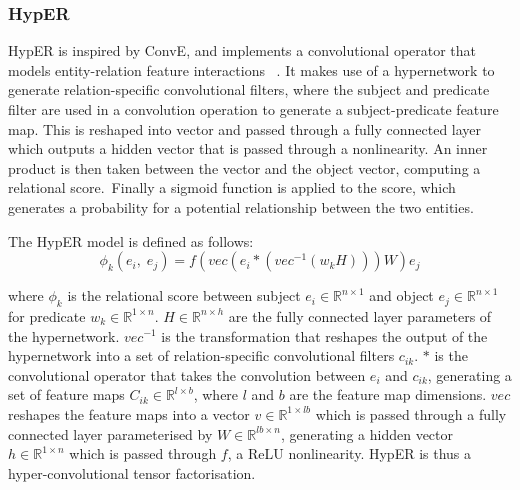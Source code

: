 \subsubsection{HypER}

\noindent HypER is inspired by ConvE, and implements a convolutional operator that models entity-relation feature interactions \unskip ~\citep{balazevic2019hypernetwork}. It makes use of a hypernetwork to generate relation-specific convolutional filters, where the subject and predicate filter are used in a convolution operation to generate a subject-predicate feature map. This is reshaped into vector and passed through a fully connected layer which outputs a hidden vector that is passed through a nonlinearity. An inner product is then taken between the vector and the object vector, computing a relational score.\ Finally a sigmoid function is applied to the score, which generates a probability for a potential relationship between the two entities. \par

\noindent The HypER model is defined as follows: 
\begin{equation}
	\phi_k(e_i, \; e_j) = f(vec(e_i * (vec^{-1}(w_kH)))W)e_j
\end{equation}

\noindent where $ \phi_k $ is the relational score between subject $ e_i \in \mathbb{R}^{n \times 1} $ and object $ e_j \in \mathbb{R}^{n \times 1} $ for predicate $ w_k \in \mathbb{R}^{1 \times n} $. $ H \in \mathbb{R}^{n \times h} $ are the fully connected layer parameters of the hypernetwork. $ vec^{-1} $ is the transformation that reshapes the output of the hypernetwork into a set of relation-specific convolutional filters $ c_{ik} $. $ * $ is the convolutional operator that takes the convolution between $ e_i $ and $ c_{ik} $, generating a set of feature maps $ C_{ik} \in \mathbb{R}^{l \times b} $, where $ l $ and $ b $ are the feature map dimensions. $ vec $ reshapes the feature maps into a vector $ v \in \mathbb{R}^{1 \times lb} $ which is passed through a fully connected layer parameterised by $ W \in \mathbb{R}^{lb \times n} $, generating a hidden vector $ h \in \mathbb{R}^{1 \times n} $ which is passed through $ f $, a ReLU nonlinearity. HypER is thus a hyper-convolutional tensor factorisation. 

